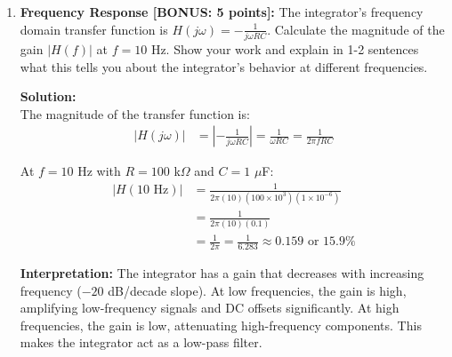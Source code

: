 \documentclass[11pt]{article}
\newenvironment{solution}
    {\color{blue}\textbf{Solution:}\\}
    {}
\begin{document}
\begin{enumerate}[label=\textbf{2.\arabic*}]
\begin{solution}
\textbf{Negative Sign Meaning:}

The negative sign indicates phase inversion. When the input is above $V_{ref}$ (positive), current flows into the capacitor's negative plate, causing the output voltage to decrease (ramp downward). Conversely, when input is below $V_{ref}$, the output ramps upward. This is characteristic of inverting op-amp configurations.

\textbf{Why $(v_{in} - V_{ref})$:}

We use $(v_{in} - V_{ref})$ because the inverting input is held at $V_{ref}$ by the virtual ground principle. Only the voltage difference drives current through $R$. If $v_{in} = V_{ref} = 7.5$ V, then $(v_{in} - V_{ref}) = 0$, no current flows, and the output remains constant. The circuit integrates relative to the AC ground reference.

\textbf{Step Input Response:}

If a step input is applied, the integrator produces a ramp output. For a positive step (sudden increase), the output ramps down linearly. For a negative step (sudden decrease), the output ramps up linearly. The slope of the ramp is determined by $-\frac{\Delta V_{in}}{RC}$. This is why integrators are used in waveform generation (e.g., triangle waves from square waves).
\end{solution}

\vspace{1cm}
    
    \item \textbf{Frequency Response [BONUS: 5 points]:} The integrator's frequency domain transfer function is $H(j\omega) = -\frac{1}{j\omega RC}$. Calculate the magnitude of the gain $|H(f)|$ at $f = 10$ Hz. Show your work and explain in 1-2 sentences what this tells you about the integrator's behavior at different frequencies.

\begin{solution}
The magnitude of the transfer function is:
\begin{align*}
|H(j\omega)| &= \left|-\frac{1}{j\omega RC}\right| = \frac{1}{\omega RC} = \frac{1}{2\pi f RC}
\end{align*}

At $f = 10$ Hz with $R = 100$ k$\Omega$ and $C = 1$ $\mu$F:
\begin{align*}
|H(10\text{ Hz})| &= \frac{1}{2\pi (10)(100 \times 10^3)(1 \times 10^{-6})}\\
&= \frac{1}{2\pi (10)(0.1)}\\
&= \frac{1}{2\pi} = \frac{1}{6.283} \approx 0.159\text{ or } 15.9\%
\end{align*}

\textbf{Interpretation:} The integrator has a gain that decreases with increasing frequency ($-20$ dB/decade slope). At low frequencies, the gain is high, amplifying low-frequency signals and DC offsets significantly. At high frequencies, the gain is low, attenuating high-frequency components. This makes the integrator act as a low-pass filter.
\end{solution}
\end{enumerate}
\end{document}
